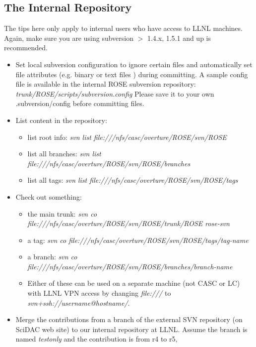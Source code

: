 \subsection{The Internal Repository}
The tips here only apply to internal users who have access to LLNL
machines.
Again, make sure you are using subversion $>$ 1.4.x, 1.5.1 and up is recommended.
\begin{itemize}
\item Set local subversion configuration to ignore certain files and
automatically set file attributes (e.g. binary or text files ) during committing. 
A sample config file is available in the internal ROSE subversion repository:\\
  \textit{trunk/ROSE/scripts/subversion.config}
Please save it to your own .subversion/config before committing files. 
\item List content in the repository:
  \begin{itemize}
          \item list root info: \textit{svn list
          file:///nfs/casc/overture/ROSE/svn/ROSE}
          \item list all branches: \textit{svn list
          file:///nfs/casc/overture/ROSE/svn/ROSE/branches}
          \item list all tags: \textit{svn list
          file:///nfs/casc/overture/ROSE/svn/ROSE/tags} 
   \end{itemize}       
\item Check out something:
   \begin{itemize}
          \item the main trunk: \textit{svn co
          file:///nfs/casc/overture/ROSE/svn/ROSE/trunk/ROSE rose-svn} 
          \item a tag: \textit{svn co
          file:///nfs/casc/overture/ROSE/svn/ROSE/tags/tag-name}
          \item a branch: \textit{svn co
          file:///nfs/casc/overture/ROSE/svn/ROSE/branches/branch-name} 
          \item Either of these can be used on a separate machine (not CASC
          or LC) with LLNL VPN access by changing \textit{file:///} to
          \textit{svn+ssh://username@hostname/}. 
    \end{itemize}      
\item Merge the contributions from a branch of the external SVN repository (on SciDAC
web site) to our internal repository at LLNL. Assume the branch is named \textit{testonly} and the
contribution is from r4 to r5,

\end{itemize}

